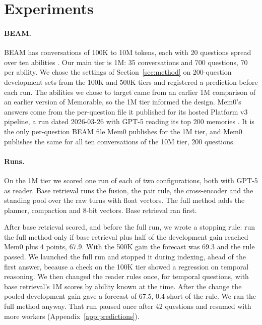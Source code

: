 \section{Experiments}
\label{sec:setup}

\paragraph{BEAM.} BEAM has conversations of 100K to 10M tokens, each with 20 questions spread over ten abilities \citep{beam2026}. Our main tier is 1M: 35 conversations and 700 questions, 70 per ability. We chose the settings of Section~\ref{sec:method} on 200-question development sets from the 100K and 500K tiers and registered a prediction before each run. The abilities we chose to target came from an earlier 1M comparison of an earlier version of Memorable, so the 1M tier informed the design. Mem0's answers come from the per-question file it published for its hosted Platform v3 pipeline, a run dated 2026-03-26 with GPT-5 reading its top 200 memories \citep{mem0benchmarks2026}. It is the only per-question BEAM file Mem0 publishes for the 1M tier, and Mem0 publishes the same for all ten conversations of the 10M tier, 200 questions.

\paragraph{Runs.} On the 1M tier we scored one run of each of two configurations, both with GPT-5 as reader. Base retrieval runs the fusion, the pair rule, the cross-encoder and the standing pool over the raw turns with float vectors. The full method adds the planner, compaction and 8-bit vectors. Base retrieval ran first.

After base retrieval scored, and before the full run, we wrote a stopping rule: run the full method only if base retrieval plus half of the development gain reached Mem0 plus 4 points, 67.9. With the 500K gain the forecast was 69.3 and the rule passed. We launched the full run and stopped it during indexing, ahead of the first answer, because a check on the 100K tier showed a regression on temporal reasoning. We then changed the reader rules once, for temporal questions, with base retrieval's 1M scores by ability known at the time. After the change the pooled development gain gave a forecast of 67.5, 0.4 short of the rule. We ran the full method anyway. That run paused once after 42 questions and resumed with more workers (Appendix~\ref{app:predictions}).

